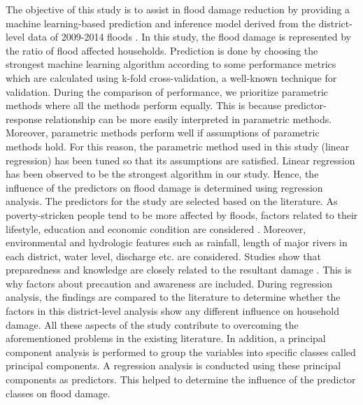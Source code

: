 \documentclass[preprint,review,12pt]{elsarticle}
\begin{document}
The objective of this study is to assist in flood damage reduction by providing a machine learning-based prediction and inference model derived from the district-level data of 2009-2014 floods \cite{disaster}. In this study, the flood damage is represented by the ratio of flood affected households. Prediction is done by choosing the strongest machine learning algorithm according to some performance metrics which are calculated using k-fold cross-validation, a well-known technique for validation. During the comparison of performance, we prioritize parametric methods where all the methods perform equally. This is because predictor-response relationship can be more easily interpreted in parametric methods. Moreover, parametric methods perform well if assumptions of parametric methods hold. For this reason, the parametric method used in this study (linear regression) has been tuned so that its assumptions are satisfied. Linear regression has been observed to be the strongest algorithm in our study. Hence, the influence of the predictors on flood damage is determined using regression analysis. The predictors for the study are selected based on the literature. As poverty-stricken people tend to be more affected by floods, factors related to their lifestyle, education and economic condition are considered \cite{dasgupta2007floods}. Moreover, environmental and hydrologic features such as rainfall, length of major rivers in each district, water level, discharge etc. are considered. Studies show that preparedness and knowledge are closely related to the resultant damage \cite{thieken2007coping}. This is why factors about precaution and awareness are included. During regression analysis, the findings are compared to the literature to determine whether the factors in this district-level analysis show any different influence on household damage. All these aspects of the study contribute to overcoming the aforementioned problems in the existing literature. In addition, a principal component analysis is performed to group the variables into specific classes called principal components. A regression analysis is conducted using these principal components as predictors. This helped to determine the influence of the predictor classes on flood damage.        
\end{document}
